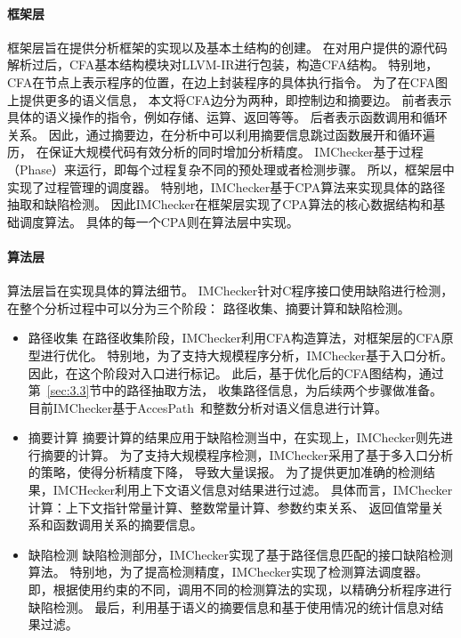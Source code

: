 \paragraph{框架层}
框架层旨在提供分析框架的实现以及基本土结构的创建。
在对用户提供的源代码解析过后，CFA基本结构模块对LLVM-IR进行包装，构造CFA结构。
特别地，CFA在节点上表示程序的位置，在边上封装程序的具体执行指令。
为了在CFA图上提供更多的语义信息，
本文将CFA边分为两种，即控制边和摘要边。
前者表示具体的语义操作的指令，例如存储、运算、返回等等。
后者表示函数调用和循环关系。
因此，通过摘要边，在分析中可以利用摘要信息跳过函数展开和循环遍历，
在保证大规模代码有效分析的同时增加分析精度。
IMChecker基于过程（Phase）来运行，即每个过程复杂不同的预处理或者检测步骤。
所以，框架层中实现了过程管理的调度器。
特别地，IMChecker基于CPA算法来实现具体的路径抽取和缺陷检测。
因此IMChecker在框架层实现了CPA算法的核心数据结构和基础调度算法。
具体的每一个CPA则在算法层中实现。

\paragraph{算法层}
算法层旨在实现具体的算法细节。
IMChecker针对C程序接口使用缺陷进行检测，在整个分析过程中可以分为三个阶段：
路径收集、摘要计算和缺陷检测。
\begin{itemize}
	\item {\kaishu 路径收集} 在路径收集阶段，IMChecker利用CFA构造算法，对框架层的CFA原型进行优化。
	特别地，为了支持大规模程序分析，IMChecker基于入口分析。
	因此，在这个阶段对入口进行标记。
	此后，基于优化后的CFA图结构，通过第~\ref{sec:3.3}节中的路径抽取方法，
	收集路径信息，为后续两个步骤做准备。
	目前IMChecker基于AccesPath~\cite{15-ase-accesspath}和整数分析对语义信息进行计算。
	\item {\kaishu 摘要计算} 
	摘要计算的结果应用于缺陷检测当中，在实现上，IMChecker则先进行摘要的计算。
	为了支持大规模程序检测，IMChecker采用了基于多入口分析的策略，使得分析精度下降，
	导致大量误报。
	为了提供更加准确的检测结果，IMCHecker利用上下文语义信息对结果进行过滤。
	具体而言，IMChecker计算：上下文指针常量计算、整数常量计算、参数约束关系、
	返回值常量关系和函数调用关系的摘要信息。
	\item {\kaishu 缺陷检测} 
	缺陷检测部分，IMChecker实现了基于路径信息匹配的接口缺陷检测算法。
	特别地，为了提高检测精度，IMChecker实现了检测算法调度器。
	即，根据使用约束的不同，调用不同的检测算法的实现，以精确分析程序进行缺陷检测。
	最后，利用基于语义的摘要信息和基于使用情况的统计信息对结果过滤。
\end{itemize}


